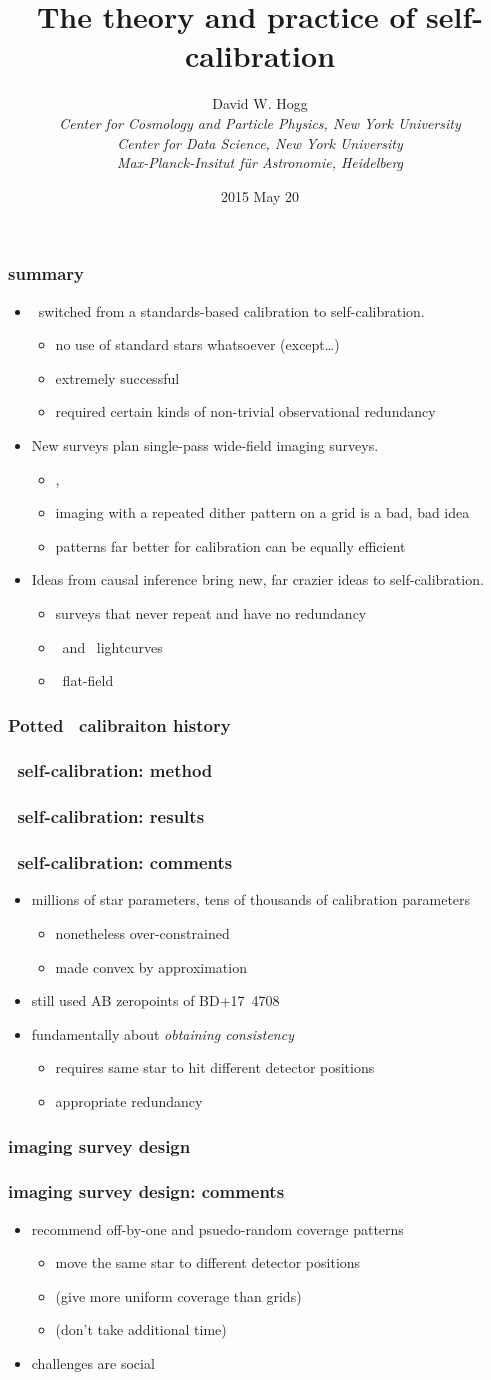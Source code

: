 \documentclass[pdftex]{beamer}
\title{The theory and practice of self-calibration}
\author[David W. Hogg (NYU)]{David W. Hogg \\
  \textsl{\small Center for Cosmology and Particle Physics,
                 New York University} \\
  \textsl{\small Center for Data Science,
                 New York University} \\
  \textsl{\small Max-Planck-Insitut f\"ur Astronomie, Heidelberg}}
\date{2015 May 20}
\newcommand{\conclusions}{%
\begin{frame}
  \frametitle{summary}
  \begin{itemize}
  \item \sdss\ switched from a standards-based calibration to self-calibration.
    \begin{itemize}
    \item no use of standard stars whatsoever (except\ldots)
    \item extremely successful
    \item required certain kinds of non-trivial observational redundancy
    \end{itemize}
  \item New surveys plan single-pass wide-field imaging surveys.
    \begin{itemize}
    \item \euclid, \wfirst
    \item imaging with a repeated dither pattern on a grid is a bad, bad idea
    \item patterns far better for calibration can be equally efficient
    \end{itemize}
  \item Ideas from causal inference bring new, far crazier ideas to self-calibration.
    \begin{itemize}
    \item surveys that never repeat and have no redundancy
    \item \kepler\ and \kt\ lightcurves
    \item \wfc\ flat-field
    \end{itemize}
  \end{itemize}
\end{frame}}
\begin{document}
\conclusions

\begin{frame}
  \titlepage
\end{frame}

\begin{frame}
  \frametitle{Potted \sdss\ calibraiton history}
\end{frame}

\begin{frame}
  \frametitle{\sdss\ self-calibration: method}
\end{frame}

\begin{frame}
  \frametitle{\sdss\ self-calibration: results}
\end{frame}

\begin{frame}
  \frametitle{\sdss\ self-calibration: comments}
  \begin{itemize}
  \item millions of star parameters, tens of thousands of calibration parameters
    \begin{itemize}
    \item nonetheless over-constrained
    \item made convex by approximation
    \end{itemize}
  \item still used AB zeropoints of BD+17~4708
  \item fundamentally about \emph{obtaining consistency}
    \begin{itemize}
    \item requires same star to hit different detector positions
    \item appropriate redundancy
    \end{itemize}
  \end{itemize}
\end{frame}

\begin{frame}
  \frametitle{imaging survey design}
\end{frame}

\begin{frame}
  \frametitle{imaging survey design: comments}
  \begin{itemize}
  \item recommend off-by-one and psuedo-random coverage patterns
    \begin{itemize}
    \item move the same star to different detector positions
    \item (give more uniform coverage than grids)
    \item (don't take additional time)
    \end{itemize}
  \item challenges are social
  \end{itemize}
\end{frame}
\end{document}
